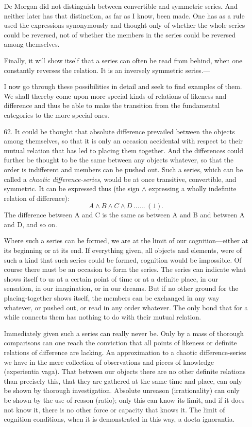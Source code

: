 \documentclass[12pt,a4paper]{book}
\newcommand{\opage}[1]{\marginnote{\footnotesize\textit{[#1]}}}
\begin{document}
De Morgan did not distinguish between convertible and symmetric series. And
neither later has that distinction, as far as I know, been made. One has as a
rule used the expressions synonymously and thought only of whether the whole
series could be reversed, not of whether the members in the series could be
reversed among themselves.

Finally, it will show itself that a series can often be read from behind,
when one constantly reverses the relation. It is an inversely symmetric
series.---

I now go through these possibilities in detail and seek to find examples of
them. We shall thereby come upon more special kinds of relations of likeness
and difference and thus be able to make the transition from the fundamental
categories to the more special ones.

62. It could be thought that absolute difference prevailed between the
objects among themselves, so that it is only an occasion accidental with
respect to their mutual relation that has led to placing them together. And
the differences could further be thought to be the same between any objects
whatever, so that the order is indifferent and members can be pushed out.
Such a series, which can be called a \emph{chaotic difference-series}, would
be at once transitive, convertible, and symmetric. It can be expressed thus
(the sign $\wedge$ expressing a wholly indefinite relation of difference):
\[ A \wedge B \wedge C \wedge D \ \ldots\ldots\ (1). \]
The difference between A and C is the same as between A and B and between A
and D, and so on.

Where such a series can be formed, we are at the limit \opage{165}of our
cognition---either at its beginning or at its end. If everything given, all
objects and elements, were of such a kind that such series could be formed,
cognition would be impossible. Of course there must be an occasion to form
the series. The series can indicate what shows itself to us at a certain
point of time or at a definite place, in our sensation, in our imagination,
or in our dreams. But if no other ground for the placing-together shows
itself, the members can be exchanged in any way whatever, or pushed out, or
read in any order whatever. The only bond that for a while connects them has
nothing to do with their mutual relation.

Immediately given such a series can really never be. Only by a mass of
thorough comparisons can one reach the conviction that all points of
likeness or definite relations of difference are lacking. An approximation to
a chaotic difference-series we have in the mere collection of observations
and pieces of knowledge (experientia vaga). That between our objects there
are no other definite relations than precisely this, that they are gathered
at the same time and place, can only be shown by thorough investigation.
Absolute unreason (irrationality) can only be shown by the use of reason
(ratio); only this can know its limit, and if it does not know it, there is
no other force or capacity that knows it. The limit of cognition conditions,
when it is demonstrated in this way, a docta ignorantia.
\end{document}
